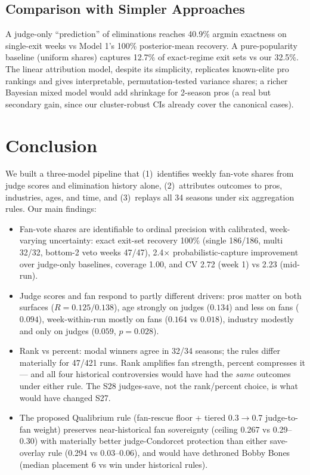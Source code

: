 \documentclass[11pt]{article}
\begin{document}
\subsection{Comparison with Simpler Approaches}

A judge-only ``prediction'' of eliminations reaches 40.9\% argmin exactness on
single-exit weeks vs Model 1's 100\% posterior-mean recovery. A pure-popularity
baseline (uniform shares) captures 12.7\% of exact-regime exit sets vs our 32.5\%.
The linear attribution model, despite its simplicity, replicates known-elite pro
rankings and gives interpretable, permutation-tested variance shares; a richer
Bayesian mixed model would add shrinkage for 2-season pros (a real but secondary
gain, since our cluster-robust CIs already cover the canonical cases).

\section{Conclusion}
\label{sec:conclusion}

We built a three-model pipeline that (1)\ identifies weekly fan-vote shares from
judge scores and elimination history alone, (2)\ attributes outcomes to pros,
industries, ages, and time, and (3)\ replays all 34 seasons under six aggregation
rules. Our main findings:

\begin{itemize}[leftmargin=2em]
\item Fan-vote shares are identifiable to ordinal precision with calibrated,
week-varying uncertainty: exact exit-set recovery 100\% (single 186/186, multi
32/32, bottom-2 veto weeks 47/47), 2.4$\times$ probabilistic-capture improvement
over judge-only baselines, coverage 1.00, and CV 2.72 (week 1) vs 2.23 (mid-run).
\item Judge scores and fan respond to partly different drivers: pros matter on
both surfaces ($R = 0.125/0.138$), age strongly on judges ($0.134$) and less on
fans ($0.094$), week-within-run mostly on fans ($0.164$ vs $0.018$), industry
modestly and only on judges ($0.059$, $p=0.028$).
\item Rank vs percent: modal winners agree in 32/34 seasons; the rules differ
materially for 47/421 runs. Rank amplifies fan strength, percent compresses it ---
and all four historical controversies would have had the \emph{same} outcomes
under either rule. The S28 judges-save, not the rank/percent choice, is what would
have changed S27.
\item The proposed Qualibrium rule (fan-rescue floor + tiered 0.3$\to$0.7
judge-to-fan weight) preserves near-historical fan sovereignty (ceiling 0.267 vs
0.29--0.30) with materially better judge-Condorcet protection than either
save-overlay rule (0.294 vs 0.03--0.06), and would have dethroned Bobby Bones
(median placement 6 vs win under historical rules).
\end{itemize}
\end{document}

